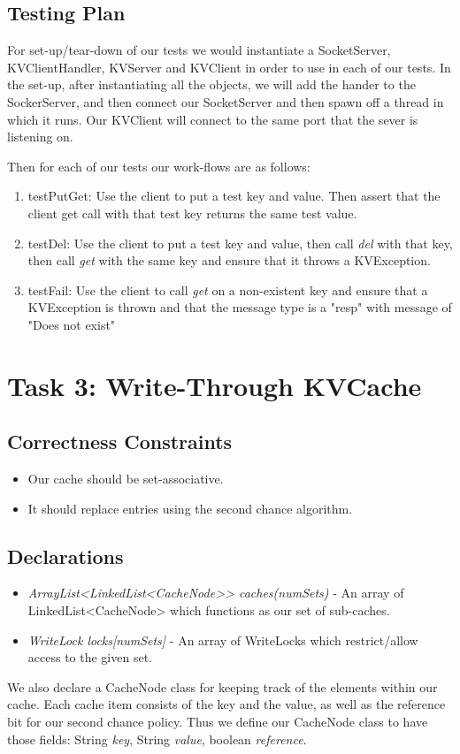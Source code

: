 \documentclass{article}
\begin{document}
\subsection*{Testing Plan}

For set-up/tear-down of our tests we would instantiate a SocketServer, KVClientHandler, KVServer and KVClient in order
to use in each of our tests. In the set-up, after instantiating all the objects, we will add the hander to the
SockerServer, and then connect our SocketServer and then spawn off a thread in which it runs. Our KVClient will
connect to the same port that the sever is listening on.

Then for each of our tests our work-flows are as follows:
\begin{enumerate}
\item testPutGet: Use the client to put a test key and value. Then assert that the client get call with that test key
returns the same test value.
\item testDel: Use the client to put a test key and value, then call \textit{del} with that key, then call \textit{get}
with the same key and ensure that it throws a KVException.
\item testFail: Use the client to call \textit{get} on a non-existent key and ensure that a KVException is thrown
and that the message type is a "resp" with message of "Does not exist"
\end{enumerate}

\section*{Task 3: Write-Through KVCache}
\subsection*{Correctness Constraints}
\begin{itemize}
\item Our cache should be set-associative.
\item It should replace entries using the second chance algorithm.
\end{itemize}

\subsection*{Declarations}
\begin{itemize}
\item \textit{ArrayList<LinkedList<CacheNode>> caches(numSets)} - An array of LinkedList<CacheNode> which functions as our set of sub-caches.
\item \textit{WriteLock locks[numSets]} - An array of WriteLocks which restrict/allow access to the given set.
\end{itemize}
We also declare a CacheNode class for keeping track of the elements within our cache. 
Each cache item consists of the key and the value, as well as the reference bit for our second chance policy. Thus we define our CacheNode
class to have those fields: String \textit{key}, String \textit{value}, boolean \textit{reference}.
\end{document}

